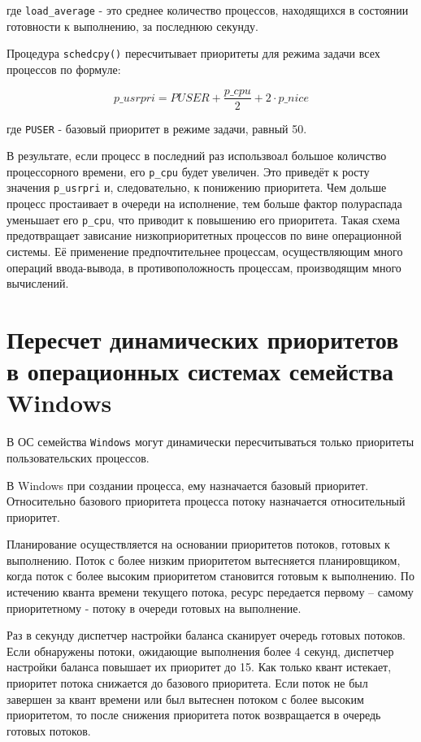 где \texttt{load\_average} - это среднее количество процессов, находящихся в состоянии готовности к выполнению, за последнюю секунду.

Процедура \texttt{schedcpy()} пересчитывает приоритеты для режима задачи всех процессов по формуле:

\begin{equation}
    p\_usrpri = PUSER + \frac{p\_cpu}{2} + 2 \cdot p\_nice
\end{equation}

где \texttt{PUSER} - базовый приоритет в режиме задачи, равный 50.

В результате, если процесс в последний раз использвоал большое количство процессорного времени, его \texttt{p\_cpu} будет увеличен. Это приведёт к росту значения \texttt{p\_usrpri} и, следовательно, к понижению приоритета. Чем дольше процесс простаивает в очереди на исполнение, тем больше фактор полураспада уменьшает его \texttt{p\_cpu}, что приводит к повышению его приоритета. Такая схема предотвращает зависание низкоприоритетных процессов по вине операционной системы. Её применение предпочтительнее процессам, осуществляющим много операций ввода-вывода, в противоположность процессам, производящим много вычислений.



\chapter{Пересчет динамических приоритетов в операционных системах семейства Windows}

В ОС семейства \texttt{Windows} могут динамически пересчитываться только приоритеты пользовательских процессов.

В Windows при создании процесса, ему назначается базовый приоритет. Относительно базового приоритета процесса потоку назначается относительный приоритет.

Планирование осуществляется на основании приоритетов потоков, готовых к выполнению. Поток с более низким приоритетом вытесняется планировщиком, когда поток с более высоким приоритетом становится готовым к выполнению. По истечению кванта времени текущего потока, ресурс передается первому – самому приоритетному - потоку в очереди готовых на выполнение.

Раз в секунду диспетчер настройки баланса сканирует очередь готовых потоков. Если обнаружены потоки, ожидающие выполнения более 4 секунд, диспетчер настройки баланса повышает их приоритет до 15. Как только квант истекает, приоритет потока снижается до базового приоритета. Если поток не был завершен за квант времени или был вытеснен потоком с более высоким приоритетом, то после снижения приоритета поток возвращается в очередь готовых потоков.

